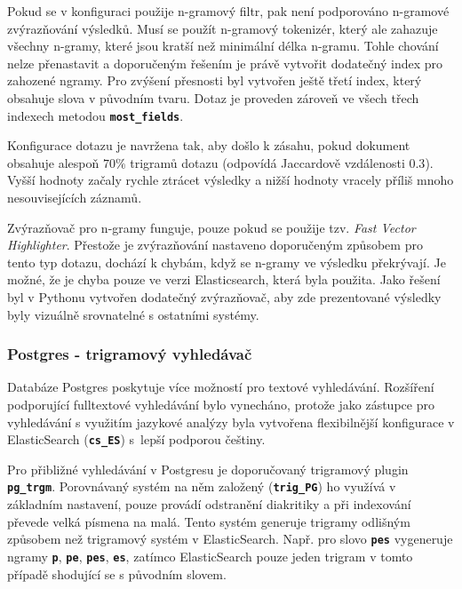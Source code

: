 \documentclass[11pt,letterpaper,oneside,openright]{book}
\newcommand{\bftt}[1]{\texttt{\textbf{#1}}}
\begin{document}
Pokud se v konfiguraci použije n-gramový filtr, pak není podporováno n-gramové
zvýrazňování výsledků. Musí se použít n-gramový tokenizér, který ale zahazuje
všechny n-gramy, které jsou kratší než minimální délka n-gramu. Tohle chování
nelze přenastavit a doporučeným řešením je právě vytvořit dodatečný index pro
zahozené ngramy. Pro zvýšení přesnosti byl vytvořen ještě třetí index, který
obsahuje slova v původním tvaru. Dotaz je proveden zároveň ve všech třech
indexech metodou \bftt{most\_fields}.

Konfigurace dotazu je navržena tak, aby došlo k zásahu, pokud dokument obsahuje
alespoň $70\%$ trigramů dotazu (odpovídá Jaccardově vzdálenosti $0.3$). Vyšší
hodnoty začaly rychle ztrácet výsledky a nižší hodnoty vracely příliš mnoho
nesouvisejících záznamů.

Zvýrazňovač pro n-gramy funguje, pouze pokud se použije tzv. \textit{Fast
Vector Highlighter}. Přestože je zvýrazňování nastaveno doporučeným způsobem
pro tento typ dotazu, dochází k chybám, když se n-gramy ve výsledku překrývají.
Je možné, že je chyba pouze ve verzi Elasticsearch, která byla použita. Jako
řešení byl v Pythonu vytvořen dodatečný zvýrazňovač, aby zde prezentované
výsledky byly vizuálně srovnatelné s ostatními systémy.

\subsubsection{Postgres - trigramový vyhledávač}
Databáze Postgres poskytuje více možností pro textové vyhledávání. Rozšíření
podporující fulltextové vyhledávání bylo vynecháno, protože jako zástupce pro
vyhledávání s využitím jazykové analýzy byla vytvořena flexibilnější
konfigurace v ElasticSearch (\bftt{cs\_ES}) s~lepší podporou češtiny.

Pro přibližné vyhledávání v Postgresu je doporučovaný trigramový plugin
\bftt{pg\_trgm}. Porovnávaný systém na něm založený (\bftt{trig\_PG}) ho
využívá v základním nastavení, pouze provádí odstranění diakritiky a při
indexování převede velká písmena na malá. Tento systém generuje trigramy
odlišným způsobem než trigramový systém v ElasticSearch. Např. pro slovo
\bftt{pes} vygeneruje ngramy \bftt{p}, \bftt{pe}, \bftt{pes}, \bftt{es},
zatímco ElasticSearch pouze jeden trigram v tomto případě shodující se s
původním slovem.



\end{document}
